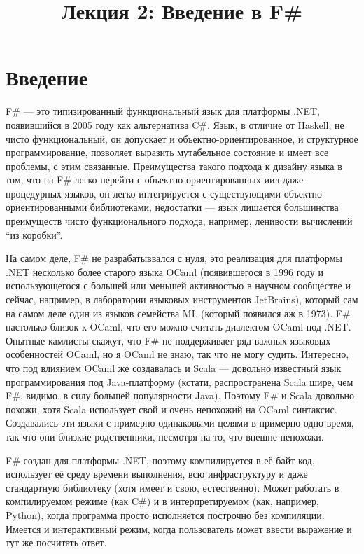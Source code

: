 \documentclass[a5paper]{article}
\title{Лекция 2: Введение в F\#}
\date{}
\begin{document}
\maketitle
\thispagestyle{empty}

\section{Введение}

F\# --- это типизированный функциональный язык для платформы .NET, появившийся в 2005 году как альтернатива C\#. Язык, в отличие от Haskell, не чисто функциональный, он допускает и объектно-ориентированное, и структурное программирование, позволяет выразить мутабельное состояние и имеет все проблемы, с этим связанные. Преимущества такого подхода к дизайну языка в том, что на F\# легко перейти с объектно-ориентированных иил даже процедурных языков, он легко интегрируется с существующими объектно-ориентированными библиотеками, недостатки --- язык лишается большинства преимуществ чисто функционального подхода, например, ленивости вычислений ``из коробки''.

На самом деле, F\# не разрабатыввался с нуля, это реализация для платформы .NET несколько более старого языка OCaml (появившегося в 1996 году и использующегося с большей или меньшей активностью в научном сообществе и сейчас, например, в лаборатории языковых инструментов JetBrains), который сам на самом деле один из языков семейства ML (который появился аж в 1973). F\# настолько близок к OCaml, что его можно считать диалектом OCaml под .NET. Опытные камлисты скажут, что F\# не поддерживает ряд важных языковых особенностей OCaml, но я OCaml не знаю, так что не могу судить. Интересно, что под влиянием OCaml же создавалась и Scala --- довольно известный язык программирования под Java-платформу (кстати, распространена Scala шире, чем F\#, видимо, в силу большей популярности Java). Поэтому F\# и Scala довольно похожи, хотя Scala использует свой и очень непохожий на OCaml синтаксис. Создавались эти языки с примерно одинаковыми целями в примерно одно время, так что они близкие родственники, несмотря на то, что внешне непохожи.

F\# создан для платформы .NET, поэтому компилируется в её байт-код, использует её среду времени выполнения, всю инфраструктуру и даже стандартную библиотеку (хотя имеет и свою, естественно). Может работать в компилируемом режиме (как C\#) и в интерпретируемом (как, например, Python), когда программа просто исполняется построчно без компиляции. Имеется и интерактивный режим, когда пользователь может ввести выражение и тут же посчитать ответ.
\end{document}
